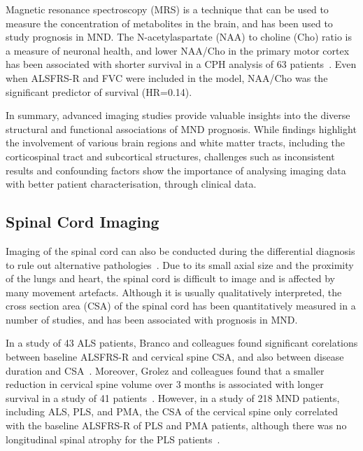 Magnetic resonance spectroscopy (MRS) is a technique that can be used to measure the concentration of metabolites in the brain, and has been used to study prognosis in MND.
The N-acetylaspartate (NAA) to choline (Cho) ratio is a measure of neuronal health, and lower NAA/Cho in the primary motor cortex has been associated with shorter survival in a CPH analysis of 63 patients~\cite{kalraCerebralDegenerationPredicts2006}.
Even when ALSFRS-R and FVC were included in the model, NAA/Cho was the significant predictor of survival (HR=0.14).

In summary, advanced imaging studies provide valuable insights into the diverse structural and functional associations of MND prognosis.
While findings highlight the involvement of various brain regions and white matter tracts, including the corticospinal tract and subcortical structures, challenges such as inconsistent results and confounding factors show the importance of analysing imaging data with better patient characterisation, through clinical data.

\subsection{Spinal Cord Imaging}

Imaging of the spinal cord can also be conducted during the differential diagnosis to rule out alternative pathologies~\cite{elmendiliSpinalCordImaging2019}.
Due to its small axial size and the proximity of the lungs and heart, the spinal cord is difficult to image and is affected by many movement artefacts.
Although it is usually qualitatively interpreted, the cross section area (CSA) of the spinal cord has been quantitatively measured in a number of studies, and has been associated with prognosis in MND.

In a study of 43 ALS patients, Branco and colleagues found significant corelations between baseline ALSFRS-R and cervical spine CSA, and also between disease duration and CSA~\cite{brancoSpinalCordAtrophy2014}.
Moreover, Grolez and colleagues found that a smaller reduction in cervical spine volume over 3 months is associated with longer survival in a study of 41 patients~\cite{grolezMRICervicalSpinal2018}.
However, in a study of 218 MND patients, including ALS, PLS, and PMA, the CSA of the cervical spine only correlated with the baseline ALSFRS-R of PLS and PMA patients, although there was no longitudinal spinal atrophy for the PLS patients~\cite{vanderburghCrosssectionalLongitudinalAssessment2019}.


